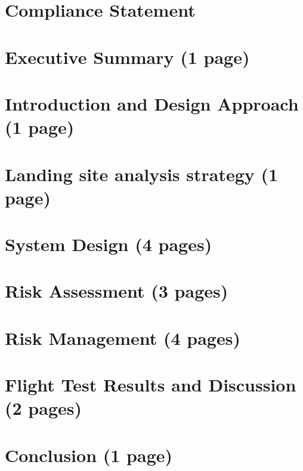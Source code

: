 \documentclass{article}
\begin{document}
\newpage

\section{Compliance Statement}
\begin{figure}
	
\end{figure}


\newpage
\section{Executive Summary (1 page)}


\newpage
\section{Introduction and Design Approach (1 page)}


\newpage
\section{Landing site analysis strategy (1 page)}


\newpage
\section{System Design (4 pages)}


\newpage
\section{Risk Assessment (3 pages)}


\newpage
\section{Risk Management (4 pages)}


\newpage
\section{Flight Test Results and Discussion (2 pages)}


\newpage
\section{Conclusion (1 page)}

\end{document}
